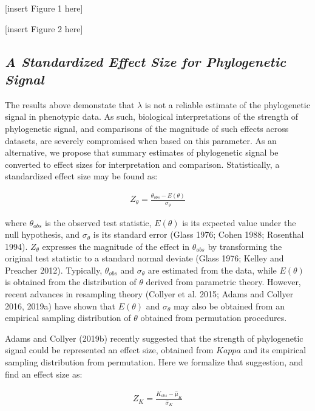 \documentclass[
]{article}
\begin{document}
{[}insert Figure 1 here{]} \hfill\break

{[}insert Figure 2 here{]} \hfill\break 

\hypertarget{a-standardized-effect-size-for-phylogenetic-signal}{%
\subsection{\texorpdfstring{\emph{A Standardized Effect Size for
Phylogenetic
Signal}}{A Standardized Effect Size for Phylogenetic Signal}}\label{a-standardized-effect-size-for-phylogenetic-signal}}

The results above demonstate that \(\lambda\) is not a reliable estimate
of the phylogenetic signal in phenotypic data. As such, biological
interpretations of the strength of phylogenetic signal, and comparisons
of the magnitude of such effects across datasets, are severely
compromised when based on this parameter. As an alternative, we propose
that summary estimates of phylogenetic signal be converted to effect
sizes for interpretation and comparison. Statistically, a standardized
effect size may be found as:

\begin{align}
    Z_{\theta}=\frac{\theta_{obs}-E(\theta)}{\sigma_\theta}
\end{align}

where \(\theta_{obs}\) is the observed test statistic, \(E(\theta)\) is
its expected value under the null hypothesis, and \(\sigma_\theta\) is
its standard error (Glass 1976; Cohen 1988; Rosenthal 1994).
\(Z_{\theta}\) expresses the magnitude of the effect in \(\theta_{obs}\)
by transforming the original test statistic to a standard normal deviate
(Glass 1976; Kelley and Preacher 2012). Typically, \(\theta_{obs}\) and
\(\sigma_\theta\) are estimated from the data, while \(E(\theta)\) is
obtained from the distribution of \(\theta\) derived from parametric
theory. However, recent advances in resampling theory (Collyer et al.
2015; Adams and Collyer 2016, 2019a) have shown that \(E(\theta)\) and
\(\sigma_\theta\) may also be obtained from an empirical sampling
distribution of \(\theta\) obtained from permutation procedures.
\hfill\break

Adams and Collyer (2019b) recently suggested that the strength of
phylogenetic signal could be represented an effect size, obtained from
\(Kappa\) and its empirical sampling distribution from permutation. Here
we formalize that suggestion, and find an effect size as:

\begin{align}
    Z_{K}=\frac{K_{obs}-\hat\mu_K}{\hat\sigma_K}
\end{align}
\end{document}
